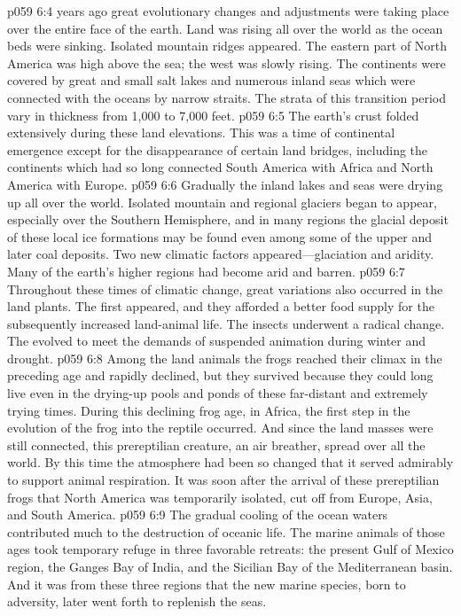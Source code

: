 \pc \vs p059 6:4  years ago great evolutionary changes and adjustments were taking place over the entire face of the earth. Land was rising all over the world as the ocean beds were sinking. Isolated mountain ridges appeared. The eastern part of North America was high above the sea; the west was slowly rising. The continents were covered by great and small salt lakes and numerous inland seas which were connected with the oceans by narrow straits. The strata of this transition period vary in thickness from 1,000 to 7,000 feet.
\vs p059 6:5 The earth’s crust folded extensively during these land elevations. This was a time of continental emergence except for the disappearance of certain land bridges, including the continents which had so long connected South America with Africa and North America with Europe.
\vs p059 6:6 Gradually the inland lakes and seas were drying up all over the world. Isolated mountain and regional glaciers began to appear, especially over the Southern Hemisphere, and in many regions the glacial deposit of these local ice formations may be found even among some of the upper and later coal deposits. Two new climatic factors appeared---glaciation and aridity. Many of the earth’s higher regions had become arid and barren.
\pc \vs p059 6:7 Throughout these times of climatic change, great variations also occurred in the land plants. The  first appeared, and they afforded a better food supply for the subsequently increased land\hyp{}animal life. The insects underwent a radical change. The  evolved to meet the demands of suspended animation during winter and drought.
\pc \vs p059 6:8 Among the land animals the frogs reached their climax in the preceding age and rapidly declined, but they survived because they could long live even in the drying\hyp{}up pools and ponds of these far\hyp{}distant and extremely trying times. During this declining frog age, in Africa, the first step in the evolution of the frog into the reptile occurred. And since the land masses were still connected, this prereptilian creature, an air breather, spread over all the world. By this time the atmosphere had been so changed that it served admirably to support animal respiration. It was soon after the arrival of these prereptilian frogs that North America was temporarily isolated, cut off from Europe, Asia, and South America.\plusone
\vs p059 6:9 The gradual cooling of the ocean waters contributed much to the destruction of oceanic life. The marine animals of those ages took temporary refuge in three favorable retreats: the present Gulf of Mexico region, the Ganges Bay of India, and the Sicilian Bay of the Mediterranean basin. And it was from these three regions that the new marine species, born to adversity, later went forth to replenish the seas.
